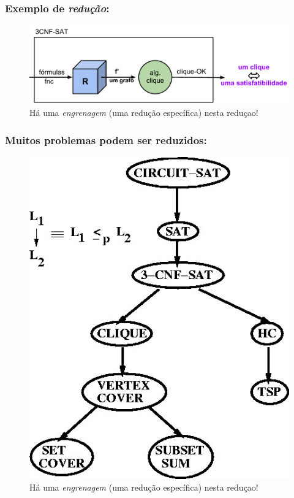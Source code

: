 \documentclass[10pt]{beamer}
\begin{document}
\begin{frame}[fragile]
\frametitle{Exemplo de \emph{redução}:}
\begin{figure}[!ht]
	\centering
	\includegraphics[height =.5\textheight,width=\textwidth]
	{figuras/reducao-3cnf-clique.pdf}
	\caption{Há uma \emph{engrenagem} (uma redução específica) nesta reduçao!}
\end{figure}
\end{frame}
%
\begin{frame}[fragile]
\frametitle{Muitos problemas podem ser reduzidos:}
\begin{figure}[!ht]
	\centering
	\includegraphics[height =.7\textheight,width=.6\textwidth]
	{figuras/reducao-problemas.jpg}
	\caption{Há uma \emph{engrenagem} (uma redução específica) nesta reduçao!}
\end{figure}
\end{frame}
%
\end{document}
